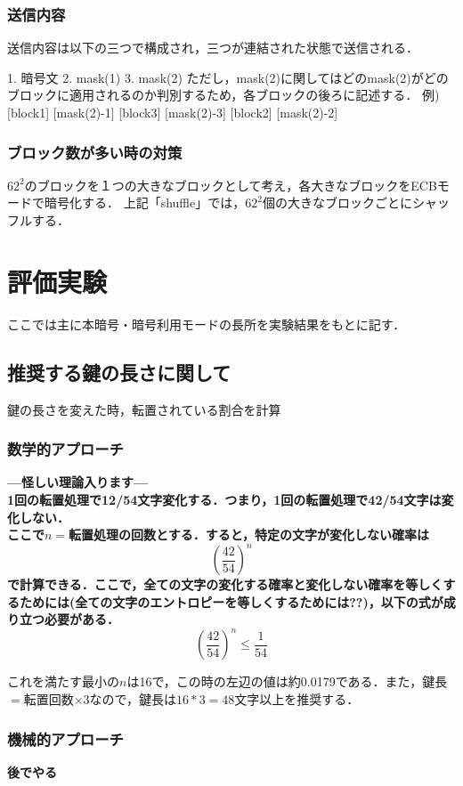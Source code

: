 \documentclass{jsarticle}
\begin{document}
\subsubsection{送信内容}
送信内容は以下の三つで構成され，三つが連結された状態で送信される．

1. 暗号文
2. mask(1)
3. mask(2)
ただし，mask(2)に関してはどのmask(2)がどのブロックに適用されるのか判別するため，各ブロックの後ろに記述する．
例) [block1] [mask(2)-1] [block3] [mask(2)-3] [block2] [mask(2)-2]

\subsubsection{ブロック数が多い時の対策}
\(62^2\)のブロックを１つの大きなブロックとして考え，各大きなブロックをECBモードで暗号化する．
上記「shuffle」では，\(62^2\)個の大きなブロックごとにシャッフルする．

\section{評価実験}
ここでは主に本暗号・暗号利用モードの長所を実験結果をもとに記す．
\subsection{推奨する鍵の長さに関して}
鍵の長さを変えた時，転置されている割合を計算\\
\subsubsection{数学的アプローチ}
\LARGE
\bf{---怪しい理論入ります---\\}
\normalsize
1回の転置処理で12/54文字変化する．つまり，1回の転置処理で42/54文字は変化しない．\\
ここで$n=$転置処理の回数とする．すると，特定の文字が変化しない確率は
\[\left(\frac{42}{54}\right)^n\]
で計算できる．ここで，全ての文字の変化する確率と変化しない確率を等しくするためには(全ての文字のエントロピーを等しくするためには??)，以下の式が成り立つ必要がある．
\[\left(\frac{42}{54}\right)^n \leq \frac{1}{54}\]

これを満たす最小の$n$は16で，この時の左辺の値は約0.0179である．また，鍵長$=$転置回数$\times 3$なので，鍵長は$16*3=48$文字以上を推奨する．

\subsubsection{機械的アプローチ}
\LARGE
\bf{後でやる\\}
\normalsize
\end{document}
